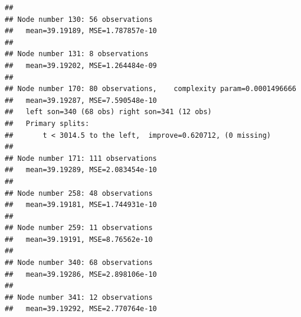 \documentclass[
]{book}
\newenvironment{Shaded}{\begin{snugshade}}{\end{snugshade}}
\newcommand{\AttributeTok}[1]{\textcolor[rgb]{0.13,0.29,0.53}{#1}}
\newcommand{\CommentTok}[1]{\textcolor[rgb]{0.56,0.35,0.01}{\textit{#1}}}
\newcommand{\ConstantTok}[1]{\textcolor[rgb]{0.56,0.35,0.01}{#1}}
\newcommand{\DecValTok}[1]{\textcolor[rgb]{0.00,0.00,0.81}{#1}}
\newcommand{\FloatTok}[1]{\textcolor[rgb]{0.00,0.00,0.81}{#1}}
\newcommand{\FunctionTok}[1]{\textcolor[rgb]{0.13,0.29,0.53}{\textbf{#1}}}
\newcommand{\NormalTok}[1]{#1}
\newcommand{\OtherTok}[1]{\textcolor[rgb]{0.56,0.35,0.01}{#1}}
\newcommand{\SpecialCharTok}[1]{\textcolor[rgb]{0.81,0.36,0.00}{\textbf{#1}}}
\newcommand{\StringTok}[1]{\textcolor[rgb]{0.31,0.60,0.02}{#1}}
\begin{document}
\begin{verbatim}
## 
## Node number 130: 56 observations
##   mean=39.19189, MSE=1.787857e-10 
## 
## Node number 131: 8 observations
##   mean=39.19202, MSE=1.264484e-09 
## 
## Node number 170: 80 observations,    complexity param=0.0001496666
##   mean=39.19287, MSE=7.590548e-10 
##   left son=340 (68 obs) right son=341 (12 obs)
##   Primary splits:
##       t < 3014.5 to the left,  improve=0.620712, (0 missing)
## 
## Node number 171: 111 observations
##   mean=39.19289, MSE=2.083454e-10 
## 
## Node number 258: 48 observations
##   mean=39.19181, MSE=1.744931e-10 
## 
## Node number 259: 11 observations
##   mean=39.19191, MSE=8.76562e-10 
## 
## Node number 340: 68 observations
##   mean=39.19286, MSE=2.898106e-10 
## 
## Node number 341: 12 observations
##   mean=39.19292, MSE=2.770764e-10
\end{verbatim}

\begin{Shaded}
\end{Shaded}
\end{document}
